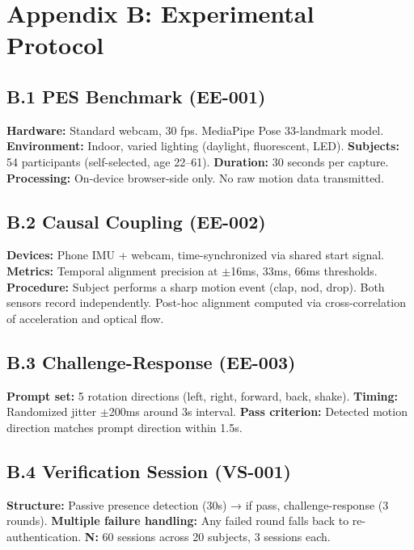 \newpage
\section*{Appendix B: Experimental Protocol}
\label{app:protocol}

\subsection*{B.1 PES Benchmark (EE-001)}

\textbf{Hardware:} Standard webcam, 30 fps. MediaPipe Pose 33-landmark model.
\textbf{Environment:} Indoor, varied lighting (daylight, fluorescent, LED).
\textbf{Subjects:} 54 participants (self-selected, age 22–61).
\textbf{Duration:} 30 seconds per capture.
\textbf{Processing:} On-device browser-side only. No raw motion data transmitted.

\subsection*{B.2 Causal Coupling (EE-002)}

\textbf{Devices:} Phone IMU + webcam, time-synchronized via shared start signal.
\textbf{Metrics:} Temporal alignment precision at $\pm$16ms, 33ms, 66ms thresholds.
\textbf{Procedure:} Subject performs a sharp motion event (clap, nod, drop). Both sensors record independently. Post-hoc alignment computed via cross-correlation of acceleration and optical flow.

\subsection*{B.3 Challenge-Response (EE-003)}

\textbf{Prompt set:} 5 rotation directions (left, right, forward, back, shake).
\textbf{Timing:} Randomized jitter $\pm$200ms around 3s interval.
\textbf{Pass criterion:} Detected motion direction matches prompt direction within 1.5s.

\subsection*{B.4 Verification Session (VS-001)}

\textbf{Structure:} Passive presence detection (30s) → if pass, challenge-response (3 rounds).
\textbf{Multiple failure handling:} Any failed round falls back to re-authentication.
\textbf{N:} 60 sessions across 20 subjects, 3 sessions each.

